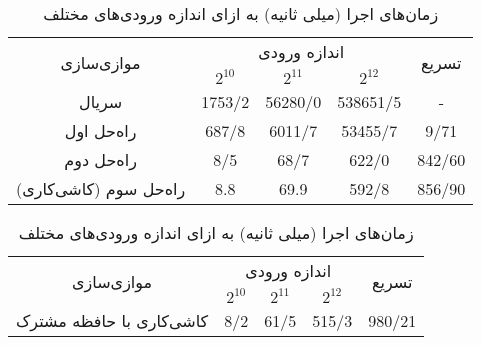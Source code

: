 \documentclass{HW}
\begin{document}
\begin{table}[ht]
\caption{زمان‌های اجرا (میلی ثانیه) به ازای اندازه ورودی‌های مختلف}
\begin{center}
\begin{tabular}{|c|c|c|c|c|}
    \hline
    \multirow{2}{*}{موازی‌سازی} & \multicolumn{3}{|c|}{اندازه ورودی}& \multirow{2}{*}{تسریع} \\
    \cline{2-4}
& $2^{10}$ & $2^{11}$ & $2^{12}$ & \\
    \hline
  سریال & 
  1753/2 & 56280/0 & 538651/5 & - \\ \hline
  
راه‌حل اول &
  687/8 & 6011/7 & 53455/7 & 9/71 \\ \hline
  
راه‌حل دوم & 
  8/5 & 68/7 & 622/0 & 842/60 \\ \hline
 
 راه‌حل سوم (کاشی‌کاری) & 
  8.8 & 69.9 & 592/8 & 856/90 \\ \hline
\end{tabular}
\end{center}
\label{tab:section2-results}
\end{table}

\begin{table}[ht]
\caption{زمان‌های اجرا (میلی ثانیه) به ازای اندازه ورودی‌های مختلف}
\begin{center}
\begin{tabular}{|c|c|c|c|c|}
    \hline
    \multirow{2}{*}{موازی‌سازی} & \multicolumn{3}{|c|}{اندازه ورودی}& \multirow{2}{*}{تسریع} \\
    \cline{2-4}
& $2^{10}$ & $2^{11}$ & $2^{12}$ & \\
    \hline
  کاشی‌کاری با حافظه مشترک & 
  8/2 & 61/5 & 515/3 &  980/21\\ \hline

\end{tabular}
\end{center}
\label{tab:section3-results}
\end{table}



\end{document}
